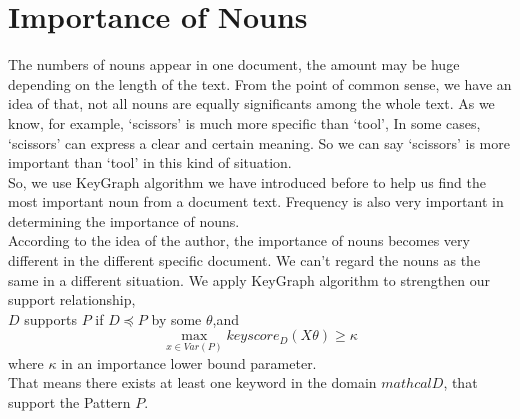 \section{Importance of Nouns}
The numbers of nouns appear in one document, the amount may be huge depending on the length of the text. From the point of common sense, we have an idea of that, not all nouns are equally significants among the whole text. As we know, for example, `scissors' is much more specific than `tool', In some cases, `scissors' can express a clear and certain meaning. So we can say `scissors' is more important than `tool' in this kind of situation. \\
So, we use KeyGraph algorithm we have introduced before to help us find the most important noun from a document text. Frequency is also very important in determining the importance of nouns.\\
According to the idea of the author, the importance of nouns becomes very different in the different specific document. We can't regard the nouns as the same in a different situation. We apply KeyGraph algorithm to strengthen our support relationship,\\
$D$ supports $P$ if $D \preceq P$ by some $\theta$,and
\begin{displaymath}
\max_{x\in Var(P)} keyscore_D(X\theta) \geq \kappa
\end{displaymath}
where $\kappa$ in an importance lower bound parameter.\\
That means there exists at least one keyword in the domain $mathcal{D}$, that support the Pattern $P$.